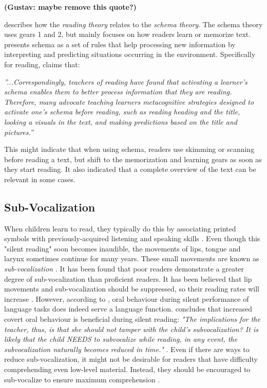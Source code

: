 \textbf{(Gustav: maybe remove this quote?)}

\citeauthor{carver_reading_1992} describes how the \textit{rauding theory} relates to the \textit{schema theory}. The schema theory uses gears 1 and 2, but mainly focuses on how readers learn or memorize text.  presents schema as a set of rules that help processing new information by interpreting and predicting situations occurring in the environment. Specifically for reading, \citeauthor{widmayer_schema_2005} claims that:

 \emph{''...Correspondingly, teachers of reading have found that activating a learner's schema enables them to better process information that they are reading. Therefore, many advocate teaching learners metacognitive strategies designed to activate one's schema before reading, such as reading heading and the title, looking a visuals in the text, and making predictions based on the title and pictures.''}

This might indicate that when using schema, readers use skimming or scanning before reading a text, but shift to the memorization and learning gears as soon as they start reading. It also indicated that a complete overview of the text can be relevant in some cases.


\subsection{Sub-Vocalization}
When children learn to read, they typically do this by associating printed symbols with previously-acquired listening and speaking skills \cite{bruinsma_should_1980}. Even though this "silent reading" soon becomes inaudible, the movements of lips, tongue and larynx sometimes continue for many years. These small movements are known as \textit{sub-vocalization} \cite{bruinsma_should_1980}. It has been found that poor readers demonstrate a greater degree of sub-vocalization than proficient readers. It has been believed that lip movements and sub-vocalization should be suppressed, so their reading rates will increase \cite{bruinsma_should_1980}. However, according to , oral behaviour during silent performance of language tasks does indeed serve a language function. \citeauthor{j_covert_1970} concludes that increased covert oral behaviour is beneficial during silent reading: \emph{"The implications for the teacher, thus, is that she should not tamper with the child's subvocalization? It is likely that the child NEEDS to subvocalize while reading, in any event, the subvocalization naturally becomes reduced in time."} \cite{bruinsma_should_1980}. Even if there are ways to reduce sub-vocalization, it might not be desirable for readers that have difficulty comprehending even low-level material. Instead, they should be encouraged to sub-vocalize to ensure maximum comprehension \cite{bruinsma_should_1980}.


